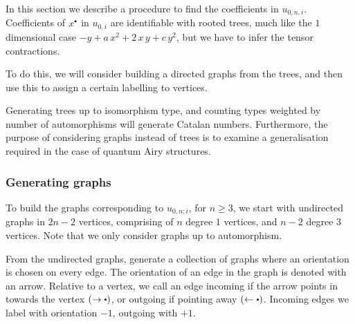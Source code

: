     In this section we describe a procedure to find the coefficients in \( u_{0,n,i}\). Coefficients of \(x^{\sbt}\) in \(u_{0,i}\) are identifiable with rooted trees, much like the \(1\) dimensional case 
    \(  - y + a \, x^2  + 2 \, x\,y + c \, y^2\), but we have to infer the tensor contractions. 
    
    To do this, we will consider building a directed graphs from the trees, and then use this to assign a certain labelling to vertices. 
    
    Generating trees up to isomorphism type, and counting types weighted by number of automorphisms will generate Catalan numbers.
    Furthermore, the purpose of considering graphs instead of trees is to examine a generalisation required in the case of quantum Airy structures.
    
    \subsubsection{Generating graphs}
    
    To build the graphs corresponding to \( u_{0,n; i}\), for \( n \geq 3\), we start with undirected graphs in \(2n-2\) vertices, comprising of \(n\) degree \(1\) vertices, and \(n-2\) degree \(3\) vertices. Note that we only consider graphs up to automorphism.
    
    From the undirected graphs, generate a collection of graphs where an orientation is chosen on every edge. The orientation of an edge in the graph is denoted with an arrow. Relative to a vertex, we call an edge incoming if the arrow points in towards the vertex \( (\rightarrow \sbt) \), or outgoing if pointing away \( ( \leftarrow \sbt)\). Incoming edges we label with orientation \(-1\), outgoing with \(+1\).  
    

